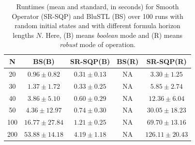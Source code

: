 \begin{table}[tb]
\small
\begin{center}
\caption{{\small Runtimes (mean and standard, in seconds) for Smooth Operator (SR-SQP) and BluSTL (BS) over 100 runs with random initial states and with different formula horizon lengths $N$. Here, (B) means \textit{boolean} mode and (R) means \textit{robust} mode of operation.}}
\vspace{-5pt}
\label{tbl:time_performance_toy}
\begin{tabular} {|c|c|c|c|c|}
	\hline
	N & BS(B) & SR-SQP(B) & BS(R) & SR-SQP(R) \\ \hline
	20 & $0.96 \pm 0.82$ &  $\mathbf{0.31 \pm 0.13}$  & NA & $3.30 \pm 1.25$ \\ \hline
	30 & $1.37 \pm 1.72$ &  $\mathbf{0.33 \pm 0.25}$  & NA & $5.85 \pm 2.74$\\ \hline
	40 & $3.86 \pm 5.10$ &  $\mathbf{0.60 \pm 0.29}$  & NA & $12.36 \pm 6.04$\\ \hline
	50 & $4.36 \pm 12.97$&  $\mathbf{0.74 \pm 0.30}$ & NA & $30.05 \pm 18.23$\\ \hline
	100& $16.77 \pm 27.84$ & $\mathbf{1.21 \pm 0.25}$ & NA & $69.70 \pm 13.16$ \\ \hline
	200& $53.88 \pm 14.18$& $\mathbf{4.19 \pm 1.18}$ & NA & $126.11 \pm 20.43$ \\ \hline
\end{tabular}	
\end{center}
\end{table}


